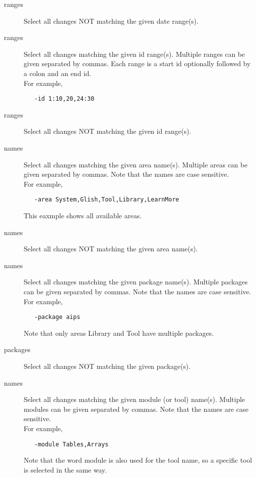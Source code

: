 \begin{description}
\item[ ranges]
   Select all changes NOT matching the given date range(s).

\item[ ranges]
   Select all changes matching the given id range(s).
   Multiple ranges can be given separated by commas.
   Each range is a start id optionally followed by a colon and an end id.
   \\For example,
\begin{verbatim}
   -id 1:10,20,24:30
\end{verbatim}

\item[ ranges]
   Select all changes NOT matching the given id range(s).

\item[ names]
   Select all changes matching the given area name(s).
   Multiple areas can be given separated by commas.
   Note that the names are case sensitive.
   \\For example,
\begin{verbatim}
   -area System,Glish,Tool,Library,LearnMore
\end{verbatim}
   This eaxmple shows all available areas.

\item[ names]
   Select all changes NOT matching the given area name(s).

\item[ names]
   Select all changes matching the given package name(s).
   Multiple packages can be given separated by commas.
   Note that the names are case sensitive.
   \\For example,
\begin{verbatim}
   -package aips
\end{verbatim}
   Note that only areas Library and Tool have multiple packages.

\item[ packages]
   Select all changes NOT matching the given package(s).

\item[ names]
   Select all changes matching the given module (or tool) name(s).
   Multiple modules can be given separated by commas.
   Note that the names are case sensitive.
   \\For example,
\begin{verbatim}
   -module Tables,Arrays
\end{verbatim}
   Note that the word module is also used for the tool name, so
   a specific tool is selected in the same way.


\end{description}
